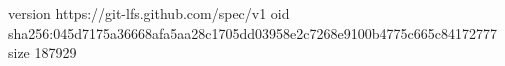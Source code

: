 version https://git-lfs.github.com/spec/v1
oid sha256:045d7175a36668afa5aa28c1705dd03958e2c7268e9100b4775c665c84172777
size 187929
